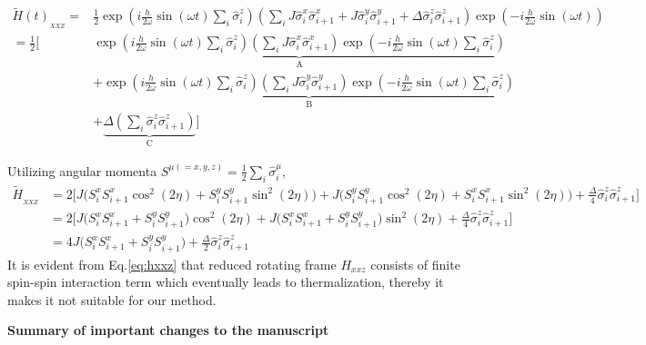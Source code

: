 \documentclass[aps,prb,reprint,showpacs,floatfix,superscriptaddress, onecolumn, nofootinbib, 9pt]{revtex4-2}
\begin{document}
\begin{enumerate}
{			\begin{align}
				\tilde{H}(t)_{_{XXZ}}= & \frac{1}{2} \exp \left(i \frac{h}{2 \omega} \sin (\omega t) \sum_{i} \hat{\sigma}_{i}^{z}\right)\left(\sum_{i} J \hat{\sigma}^x_i \hat{\sigma}^x_{i+1} + J \hat{\sigma}^y_i \hat{\sigma}^y_{i+1}+ \Delta  \hat{\sigma}^z_i \hat{\sigma}^z_{i+1}\right) \exp \left(-i \frac{h}{2 \omega} \sin (\omega t)\right)\nonumber\\
				= \frac12 \Bigg[& \underbrace{\exp \left(i \frac{h}{2 \omega} \sin (\omega t) \sum_{i} \hat{\sigma}_{i}^{z}\right)\left(\sum_{i} J \hat{\sigma}_{i}^{x} \hat{\sigma}_{i+1}^{x}\right) \exp \left(-i \frac{h}{2 \omega} \sin (\omega t) \sum_i\hat{\sigma}_{i}^{z}\right)}_{\mathrm{A}} \nonumber\\
				& +\underbrace{\exp \left(i \frac{h}{2 \omega} \sin (\omega t) \sum_{i} \hat{\sigma}_{i}^{z}\right)\left(\sum_{i} J \hat{\sigma}_{i}^{y} \hat{\sigma}_{i+1}^{y}\right) \exp \left(-i \frac{h}{2 \omega} \sin (\omega t) \sum_i\hat{\sigma}_{i}^{z}\right)}_{\mathrm{B}} \nonumber\\
				& +\underbrace{\Delta \left(\sum_{i}  \hat{\sigma}_{i}^{z} \hat{\sigma}_{i+1}^{z}\right)}_{\mathrm{C}}\Bigg]
				\label{eq:xxz1}
			\end{align}
		
		Utilizing angular momenta $\displaystyle S^{\mu(=x,y,z)} = \frac12\sum_i \hat{\sigma}^\mu_i$, 
		\begin{align}
		\tilde{H}_{_{XXZ}} &= 2\Bigg[J\Big(S^x_i S^x_{i+1}\cos^2(2\eta) + S^y_i S^y_{i+1}\sin^2(2\eta)\Big) + J\Big(S^y_i S^y_{i+1}\cos^2(2\eta) + S^x_i S^x_{i+1}\sin^2(2\eta)\Big) + \frac{\Delta}{4}\hat{\sigma}_{i}^{z} \hat{\sigma}_{i+1}^{z}\Bigg] \nonumber\\
		&= 2\Bigg[J\Big(S^x_i S^x_{i+1} + S^y_i S^y_{i+1}\Big)\cos^2(2\eta) + J\Big(S^x_i S^x_{i+1} + S^y_i S^y_{i+1}\Big)\sin^2(2\eta) + \frac{\Delta}{4}\hat{\sigma}_{i}^{z} \hat{\sigma}_{i+1}^{z}\Bigg]\nonumber\\
		&= 4J\Big(S^x_i S^x_{i+1} + S^y_i S^y_{i+1}\Big) + \frac{\Delta}{2}\hat{\sigma}_{i}^{z} \hat{\sigma}_{i+1}^{z}
		\label{eq:hxxz}
		\end{align}
		It is evident from Eq.\eqref{eq:hxxz} that reduced rotating frame $H_{xxz}$ consists of finite spin-spin interaction term which eventually leads to thermalization, thereby it makes it not suitable for our method.
		}
	\end{enumerate}
	\vskip 1cm 
	\noindent \textbf{Summary of important changes to the  manuscript}
	
\end{document}
